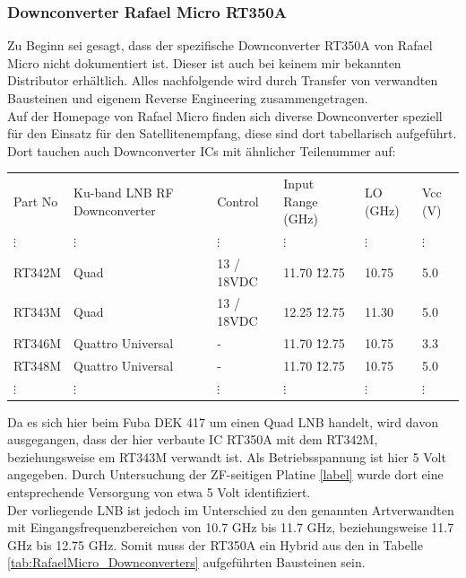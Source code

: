 \documentclass[]{article}
\begin{document}
	\subsubsection{Downconverter Rafael Micro RT350A}
		
		\noindent Zu Beginn sei gesagt, dass der spezifische Downconverter RT350A von Rafael Micro nicht dokumentiert ist. Dieser ist auch bei keinem mir bekannten Distributor erhältlich. Alles nachfolgende wird durch Transfer von verwandten Bausteinen und eigenem Reverse Engineering zusammengetragen.\\
		
		\noindent Auf der Homepage von Rafael Micro \cite{RafaelMicro} finden sich diverse Downconverter speziell für den Einsatz für den Satellitenempfang, diese sind dort tabellarisch aufgeführt. Dort tauchen auch Downconverter ICs mit ähnlicher Teilenummer auf:\\
		
		
		\begin{minipage}{\textwidth}
			{\scriptsize
				\begin{tabular}{llllll}
					Part No & Ku-band LNB RF Downconverter & Control & Input Range (GHz) & LO (GHz) & Vcc (V)\\
					$\vdots$ & $\vdots$ & $\vdots$ & $\vdots$ & $\vdots$ & $\vdots$\\
					RT342M & Quad & 13 / 18VDC & 11.70 \~ 12.75 & 10.75 & 5.0\\
					RT343M & Quad & 13 / 18VDC & 12.25 \~ 12.75 & 11.30 & 5.0\\
					RT346M & Quattro Universal & - & 11.70 \~ 12.75 & 10.75 & 3.3\\
					RT348M & Quattro Universal & - & 11.70 \~ 12.75 & 10.75 & 5.0\\
					$\vdots$ & $\vdots$ & $\vdots$ & $\vdots$ & $\vdots$ & $\vdots$
				\end{tabular}
			}
		\end{minipage}
		
		
		\noindent Da es sich hier beim Fuba DEK 417 um einen Quad LNB handelt, wird davon ausgegangen, dass der hier verbaute IC RT350A mit dem RT342M, beziehungsweise em RT343M verwandt ist. Als Betriebsspannung ist hier 5 Volt angegeben. Durch Untersuchung der ZF-seitigen Platine \ref{label} wurde dort eine entsprechende Versorgung von etwa 5 Volt identifiziert.\\
		
		\noindent Der vorliegende LNB ist jedoch im Unterschied zu den genannten Artverwandten mit Eingangsfrequenzbereichen von 10.7 GHz bis 11.7 GHz, beziehungsweise 11.7 GHz bis 12.75 GHz. Somit muss der RT350A ein Hybrid aus den in Tabelle \ref{tab:RafaelMicro_Downconverters} aufgeführten Bausteinen sein.\\
		
\end{document}
